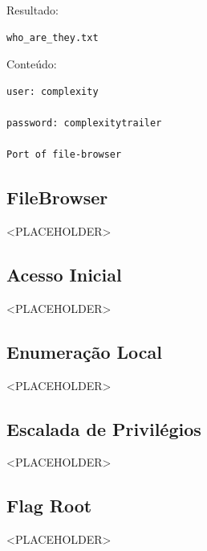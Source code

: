 Resultado:

\begin{lstlisting}
who_are_they.txt
\end{lstlisting}

Conteúdo:

\begin{lstlisting}
user: complexity

password: complexitytrailer

Port of file-browser
\end{lstlisting}


\subsection{FileBrowser}

<PLACEHOLDER>


\subsection{Acesso Inicial}

<PLACEHOLDER>


\subsection{Enumeração Local}

<PLACEHOLDER>


\subsection{Escalada de Privilégios}

<PLACEHOLDER>


\subsection{Flag Root}

<PLACEHOLDER>


